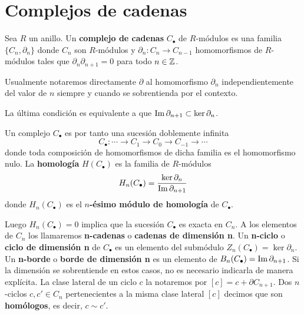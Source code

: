 \section{Complejos de cadenas}

\begin{definicion}
	Sea $R$ un anillo. Un \textbf{complejo de cadenas} $C_{\bullet}$ de $R$-módulos es una familia $\{C_n, \partial_n\}$ donde $C_n$ son $R$-módulos y $\partial_n : C_n \rightarrow C_{n-1}$ homomorfismos de $R$-módulos tales que $\partial_n \partial_{n+1} = 0$ para todo $n \in \mathbb{Z}$.
\end{definicion}
\begin{nota}
	Usualmente notaremos directamente $\partial$ al homomorfismo $\partial_n$ independientemente del valor de $n$ siempre y cuando se sobrentienda por el contexto.
\end{nota}
\begin{observacion}
	La última condición es equivalente a que $\operatorname{Im}{\partial_{n+1}} \subset \ker{\partial_n}$.
\end{observacion}
Un complejo $C_{\bullet}$  es por tanto una sucesión doblemente infinita
\[ C_{\bullet} : \cdots \rightarrow C_{1} \rightarrow C_0 \rightarrow C_{-1} \rightarrow \cdots \]
donde toda composición de homomorfismos de dicha familia es el homomorfismo nulo. La \textbf{homología} $H(C_{\bullet})$ es la familia de $R$-módulos
\[ H_n(C_{\bullet}) = \frac{\ker \partial_n}{\operatorname{Im} \partial_{n+1}} \]
donde $H_n(C_{\bullet})$ es el \textbf{$n$-ésimo módulo de homología} de $C_{\bullet}$.

Luego $H_n(C_{\bullet})=0$ implica que la sucesión $C_{\bullet}$ es exacta en $C_n$. A los elementos de $C_n$ los llamaremos \textbf{n-cadenas} o \textbf{cadenas de dimensión n}. Un \textbf{n-ciclo} o \textbf{ciclo de dimensión n} de $C_{\bullet}$ es un elemento del submódulo $Z_n(C_{\bullet}) = \ker \partial_n$. Un \textbf{n-borde} o \textbf{borde de dimensión n} es un elemento de $B_n(C_{\bullet})= \operatorname{Im}{\partial_{n+1}}$. Si la dimensión se sobrentiende en estos casos, no es necesario indicarla de manera explícita. La clase lateral de un ciclo $c$ la notaremos por $[c] = c + \partial C_{n+1}$. Dos $n$-ciclos $c,c' \in C_n$ pertenecientes a la misma clase lateral $[c]$ decimos que son \textbf{homólogos}, es decir, $c \sim c'$.

